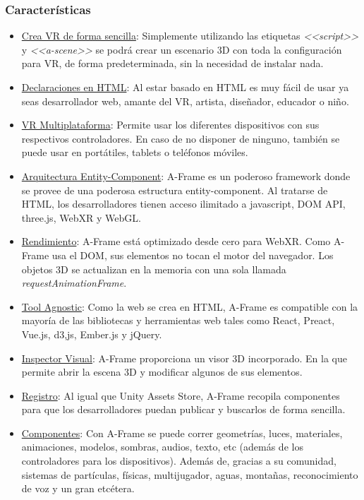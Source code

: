 \documentclass[a4paper, 12pt]{book}
\begin{document}
\subsubsection{Características}
\begin{itemize}
\item \underline{Crea VR de forma sencilla}: Simplemente utilizando las etiquetas \textit{<<script>>} y \textit{<<a-scene>>} se podrá crear un escenario 3D con toda la configuración para VR, de forma predeterminada, sin la necesidad de instalar nada.

\item \underline{Declaraciones en HTML}: Al estar basado en HTML es muy f\'acil de usar ya seas desarrollador web, amante del VR, artista, diseñador, educador o niño.
\item \underline{VR Multiplataforma}: Permite usar los diferentes dispositivos con sus respectivos controladores. En caso de no disponer de ninguno, también se puede usar en portátiles, tablets o teléfonos  móviles.
\item \underline{Arquitectura Entity-Component}: A-Frame es un poderoso framework donde se provee de una poderosa estructura entity-component. Al tratarse de HTML, los desarrolladores tienen acceso ilimitado a javascript, DOM API, three.js, WebXR y WebGL.
\item \underline{Rendimiento}: A-Frame está optimizado desde cero para WebXR. Como A-Frame usa el DOM, sus elementos no tocan el motor del navegador. Los objetos 3D se actualizan en la memoria con una sola llamada \textit{requestAnimationFrame}.
\item \underline{Tool Agnostic}: Como la web se crea en HTML, A-Frame es compatible con la mayoría de las bibliotecas y herramientas web tales como React, Preact, Vue.js, d3,js, Ember.js y jQuery.
\item \underline{Inspector Visual}: A-Frame proporciona un visor 3D incorporado. En la que permite abrir la escena 3D y modificar algunos de sus elementos.
\item \underline{Registro}: Al igual que Unity Assets Store, A-Frame recopila componentes para que los desarrolladores puedan publicar y buscarlos de forma sencilla.
\item \underline{Componentes}: Con A-Frame se puede correr geometrías, luces, materiales, animaciones, modelos, sombras, audios, texto, etc (además de los controladores para los dispositivos). Además de, gracias a su comunidad, sistemas de partículas, físicas, multijugador, aguas, montañas, reconocimiento de voz y un gran etcétera.
\end{itemize}
\end{document}
